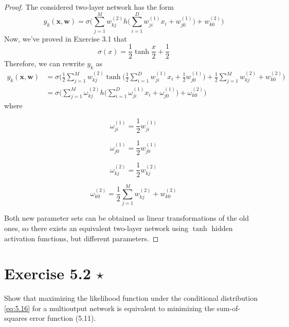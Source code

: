 \begin{proof}
    The considered two-layer network has the form
    \begin{equation}\label{eq:5.7}\tag{5.7}
        y_k(\mathbf{x}, \mathbf{w}) 
        = \sigma\bigg(\sum_{j=1}^{M} w_{kj}^{(2)} 
        h\bigg(\sum_{i=1}^{D} w_{ji}^{(1)}x_i + w_{j0}^{(1)}\bigg) + w_{k0}^{(2)}\bigg)
    \end{equation}
    Now, we've proved in Exercise 3.1 that 
    \[
        \sigma(x) = \frac{1}{2} \tanh \frac{x}{2} + \frac{1}{2}
    \] 
    Therefore, we can rewrite $y_k$ as
    \begin{align*}
        y_k(\mathbf{x}, \mathbf{w})
        &= \sigma\bigg(\frac{1}{2}\sum_{j=1}^{M} w_{kj}^{(2)} 
            \tanh\bigg(\frac{1}{2}\sum_{i=1}^{D} w_{ji}^{(1)}x_i + \frac{1}{2} w_{j0}^{(1)}\bigg)
            + \frac{1}{2} \sum_{j=1}^{M} w_{kj}^{(2)} + w_{k0}^{(2)}\bigg) \\
        &= \sigma\bigg(\sum_{j=1}^{M} \omega_{kj}^{(2)} 
        h\bigg(\sum_{i=1}^{D} \omega_{ji}^{(1)}x_i + \omega_{j0}^{(1)}\bigg) + \omega_{k0}^{(2)}\bigg)
    \end{align*}
    where 
    \newline
    \begin{minipage}[b]{0.25\textwidth}
    \[
       \omega_{ji}^{(1)} = \frac{1}{2} w_{ji}^{(1)}
    \]
    \end{minipage}
    \begin{minipage}[b]{0.25\textwidth}
    \[
        \omega_{j0}^{(1)} = \frac{1}{2} w_{j0}^{(1)}
    \] 
    \end{minipage}
    \begin{minipage}[b]{0.25\textwidth}
    \[
        \omega_{kj}^{(2)} = \frac{1}{2} w_{kj}^{(2)}
    \]
    \end{minipage}
    \begin{minipage}[b]{0.25\textwidth}
        \[
            \omega_{k0}^{(2)} = \frac{1}{2}\sum_{j = 1}^M w_{kj}^{(2)} + w_{k0}^{(2)}
        \] 
    \end{minipage}
    Both new parameter sets can be obtained as linear transformations of the old ones,
    so there exists an equivalent two-layer network using $\tanh$ hidden activation functions,
    but different parameters.
\end{proof}

\section*{Exercise 5.2 $\star$}
Show that maximizing the likelihood function under the conditional 
distribution \eqref{eq:5.16} for a multioutput network is equivalent to minimizing
the sum-of-squares error function (5.11).

